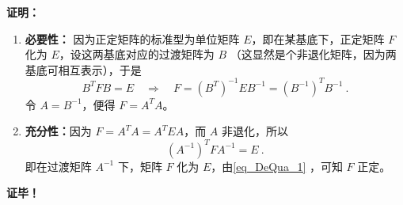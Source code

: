 \textbf{证明：}
\begin{enumerate}
\item \textbf{必要性：}
因为正定矩阵的标准型为单位矩阵 $E$，即在某基底下，正定矩阵 $F$ 化为 $E$，设这两基底对应的过渡矩阵为 $B$ （这显然是个非退化矩阵，因为两基底可相互表示），于是
\begin{equation}
B^TFB=E\quad\Rightarrow\quad F={(B^T)}^{-1}EB^{-1}={(B^{-1})}^TB^{-1}~.
\end{equation}
令 $A=B^{-1}$，便得 $F=A^TA$。
\item \textbf{充分性：}因为 $F=A^TA=A^TEA$，而 $A$ 非退化，所以
\begin{equation}
{(A^{-1})}^TFA^{-1}=E~.
\end{equation}
即在过渡矩阵 $A^{-1}$ 下，矩阵 $F$ 化为 $E$，由\autoref{eq_DeQua_1} ，可知 $F$ 正定。
\end{enumerate}
\textbf{证毕！}
